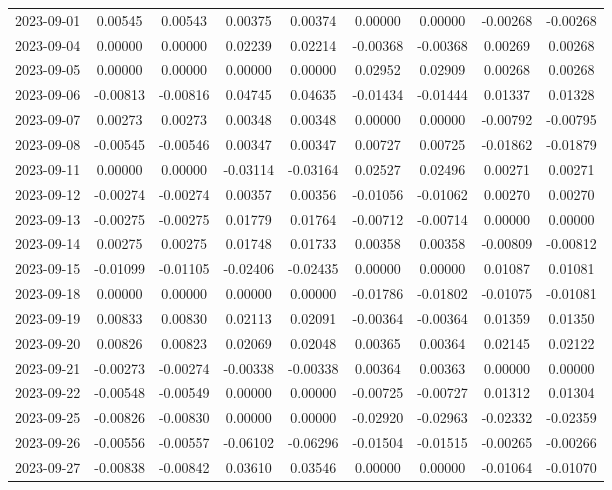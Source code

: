 \begin{footnotesize}
\begin{longtable}{lcccccccc}
2023-09-01 & 0.00545 & 0.00543 & 0.00375 & 0.00374 & 0.00000 & 0.00000 & -0.00268 & -0.00268 \\
2023-09-04 & 0.00000 & 0.00000 & 0.02239 & 0.02214 & -0.00368 & -0.00368 & 0.00269 & 0.00268 \\
2023-09-05 & 0.00000 & 0.00000 & 0.00000 & 0.00000 & 0.02952 & 0.02909 & 0.00268 & 0.00268 \\
2023-09-06 & -0.00813 & -0.00816 & 0.04745 & 0.04635 & -0.01434 & -0.01444 & 0.01337 & 0.01328 \\
2023-09-07 & 0.00273 & 0.00273 & 0.00348 & 0.00348 & 0.00000 & 0.00000 & -0.00792 & -0.00795 \\
2023-09-08 & -0.00545 & -0.00546 & 0.00347 & 0.00347 & 0.00727 & 0.00725 & -0.01862 & -0.01879 \\
2023-09-11 & 0.00000 & 0.00000 & -0.03114 & -0.03164 & 0.02527 & 0.02496 & 0.00271 & 0.00271 \\
2023-09-12 & -0.00274 & -0.00274 & 0.00357 & 0.00356 & -0.01056 & -0.01062 & 0.00270 & 0.00270 \\
2023-09-13 & -0.00275 & -0.00275 & 0.01779 & 0.01764 & -0.00712 & -0.00714 & 0.00000 & 0.00000 \\
2023-09-14 & 0.00275 & 0.00275 & 0.01748 & 0.01733 & 0.00358 & 0.00358 & -0.00809 & -0.00812 \\
2023-09-15 & -0.01099 & -0.01105 & -0.02406 & -0.02435 & 0.00000 & 0.00000 & 0.01087 & 0.01081 \\
2023-09-18 & 0.00000 & 0.00000 & 0.00000 & 0.00000 & -0.01786 & -0.01802 & -0.01075 & -0.01081 \\
2023-09-19 & 0.00833 & 0.00830 & 0.02113 & 0.02091 & -0.00364 & -0.00364 & 0.01359 & 0.01350 \\
2023-09-20 & 0.00826 & 0.00823 & 0.02069 & 0.02048 & 0.00365 & 0.00364 & 0.02145 & 0.02122 \\
2023-09-21 & -0.00273 & -0.00274 & -0.00338 & -0.00338 & 0.00364 & 0.00363 & 0.00000 & 0.00000 \\
2023-09-22 & -0.00548 & -0.00549 & 0.00000 & 0.00000 & -0.00725 & -0.00727 & 0.01312 & 0.01304 \\
2023-09-25 & -0.00826 & -0.00830 & 0.00000 & 0.00000 & -0.02920 & -0.02963 & -0.02332 & -0.02359 \\
2023-09-26 & -0.00556 & -0.00557 & -0.06102 & -0.06296 & -0.01504 & -0.01515 & -0.00265 & -0.00266 \\
2023-09-27 & -0.00838 & -0.00842 & 0.03610 & 0.03546 & 0.00000 & 0.00000 & -0.01064 & -0.01070 \\

\end{longtable}
\end{footnotesize}
